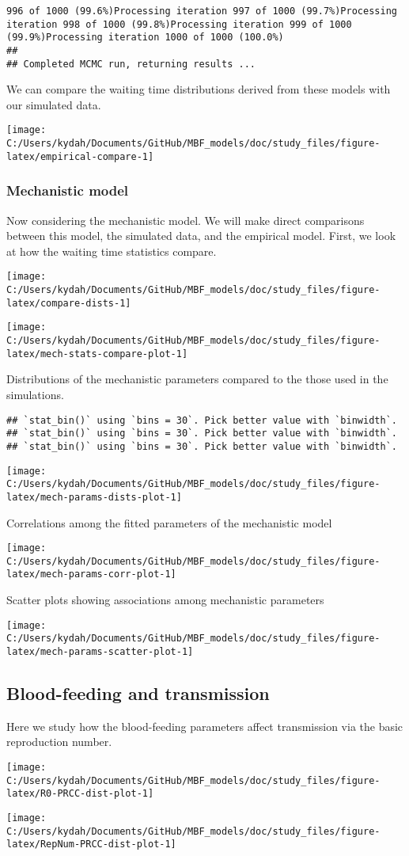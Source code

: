 \documentclass[
]{article}
\begin{document}
\begin{verbatim}
996 of 1000 (99.6%)Processing iteration 997 of 1000 (99.7%)Processing iteration 998 of 1000 (99.8%)Processing iteration 999 of 1000 (99.9%)Processing iteration 1000 of 1000 (100.0%)
## 
## Completed MCMC run, returning results ...
\end{verbatim}

We can compare the waiting time distributions derived from these models
with our simulated data.

\texttt{[image: C:/Users/kydah/Documents/GitHub/MBF\_models/doc/study\_files/figure-latex/empirical-compare-1]}

\hypertarget{mechanistic-model}{%
\subsubsection{Mechanistic model}\label{mechanistic-model}}

Now considering the mechanistic model. We will make direct comparisons
between this model, the simulated data, and the empirical model. First,
we look at how the waiting time statistics compare.

\texttt{[image: C:/Users/kydah/Documents/GitHub/MBF\_models/doc/study\_files/figure-latex/compare-dists-1]}

\texttt{[image: C:/Users/kydah/Documents/GitHub/MBF\_models/doc/study\_files/figure-latex/mech-stats-compare-plot-1]}

Distributions of the mechanistic parameters compared to the those used
in the simulations.

\begin{verbatim}
## `stat_bin()` using `bins = 30`. Pick better value with `binwidth`.
## `stat_bin()` using `bins = 30`. Pick better value with `binwidth`.
## `stat_bin()` using `bins = 30`. Pick better value with `binwidth`.
\end{verbatim}

\texttt{[image: C:/Users/kydah/Documents/GitHub/MBF\_models/doc/study\_files/figure-latex/mech-params-dists-plot-1]}

Correlations among the fitted parameters of the mechanistic model

\texttt{[image: C:/Users/kydah/Documents/GitHub/MBF\_models/doc/study\_files/figure-latex/mech-params-corr-plot-1]}

Scatter plots showing associations among mechanistic parameters

\texttt{[image: C:/Users/kydah/Documents/GitHub/MBF\_models/doc/study\_files/figure-latex/mech-params-scatter-plot-1]}

\hypertarget{blood-feeding-and-transmission}{%
\subsection{Blood-feeding and
transmission}\label{blood-feeding-and-transmission}}

Here we study how the blood-feeding parameters affect transmission via
the basic reproduction number.

\texttt{[image: C:/Users/kydah/Documents/GitHub/MBF\_models/doc/study\_files/figure-latex/R0-PRCC-dist-plot-1]}

\texttt{[image: C:/Users/kydah/Documents/GitHub/MBF\_models/doc/study\_files/figure-latex/RepNum-PRCC-dist-plot-1]}
\end{document}
